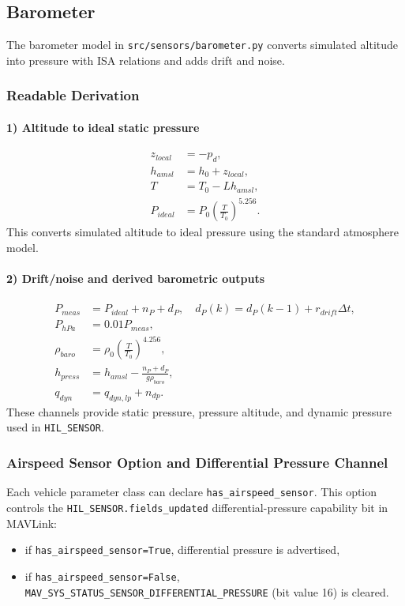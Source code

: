 \documentclass[11pt,a4paper]{article}
\begin{document}
\subsection{Barometer}
The barometer model in \texttt{src/sensors/barometer.py} converts simulated altitude into pressure with ISA relations and adds drift and noise.

\subsubsection*{Readable Derivation}
\paragraph{1) Altitude to ideal static pressure}
\begin{align}
z_{local} &= -p_d, \\
h_{amsl} &= h_0 + z_{local}, \\
T &= T_0 - Lh_{amsl}, \\
P_{ideal} &= P_0\left(\frac{T}{T_0}\right)^{5.256}.
\end{align}
This converts simulated altitude to ideal pressure using the standard atmosphere model.

\paragraph{2) Drift/noise and derived barometric outputs}
\begin{align}
P_{meas} &= P_{ideal} + n_P + d_P, \quad d_P(k)=d_P(k-1)+r_{drift}\Delta t, \\
P_{hPa} &= 0.01P_{meas}, \\
\rho_{baro} &= \rho_0\left(\frac{T}{T_0}\right)^{4.256}, \\
h_{press} &= h_{amsl} - \frac{n_P+d_P}{g\rho_{baro}}, \\
q_{dyn} &= q_{dyn,lp} + n_{dp}.
\end{align}
These channels provide static pressure, pressure altitude, and dynamic pressure used in \texttt{HIL\_SENSOR}.

\subsubsection*{Airspeed Sensor Option and Differential Pressure Channel}
Each vehicle parameter class can declare \texttt{has\_airspeed\_sensor}. This option controls the \texttt{HIL\_SENSOR.fields\_updated} differential-pressure capability bit in MAVLink:
\begin{itemize}
    \item if \texttt{has\_airspeed\_sensor=True}, differential pressure is advertised,
    \item if \texttt{has\_airspeed\_sensor=False}, \texttt{MAV\_SYS\_STATUS\_SENSOR\_DIFFERENTIAL\_PRESSURE} (bit value 16) is cleared.
\end{itemize}
\end{document}
